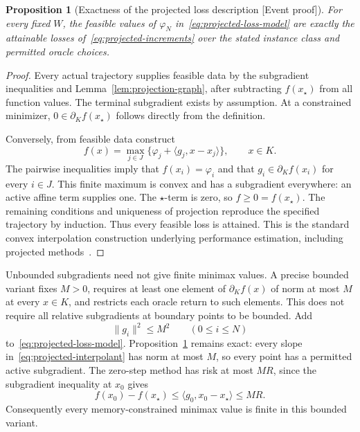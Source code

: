 \documentclass[11pt]{article}
\newcommand{\supportlabel}[1]{\textcolor{blue!60!black}{\small\textsf{[#1]}}}
\newcommand{\eventproof}{\supportlabel{Event proof}}
\numberwithin{equation}{section}
\newtheorem{proposition}[theorem]{Proposition}
\theoremstyle{definition}
\begin{document}
\begin{proposition}[Exactness of the projected loss description \eventproof]\label{prop:projected-loss}
For every fixed $W$, the feasible values of $\varphi_N$ in~\eqref{eq:projected-loss-model} are exactly the attainable losses of~\eqref{eq:projected-increments} over the stated instance class and permitted oracle choices.
\end{proposition}
\begin{proof}
Every actual trajectory supplies feasible data by the subgradient inequalities and Lemma~\ref{lem:projection-graph}, after subtracting $f(x_\star)$ from all function values. The terminal subgradient exists by assumption. At a constrained minimizer, $0\in\partial_K f(x_\star)$ follows directly from the definition.

Conversely, from feasible data construct
\begin{equation}
 f(x)=\max_{j\in J}
       \{\varphi_j+\langle g_j,x-x_j\rangle\},\qquad x\in K.
 \label{eq:projected-interpolant}
\end{equation}
The pairwise inequalities imply that $f(x_i)=\varphi_i$ and that $g_i\in\partial_K f(x_i)$ for every $i\in J$. This finite maximum is convex and has a subgradient everywhere: an active affine term supplies one. The $\star$-term is zero, so $f\ge0=f(x_\star)$. The remaining conditions and uniqueness of projection reproduce the specified trajectory by induction. Thus every feasible loss is attained. This is the standard convex interpolation construction underlying performance estimation, including projected methods~\cite{THGcomp}.
\end{proof}

Unbounded subgradients need not give finite minimax values. A precise bounded variant fixes $M>0$, requires at least one element of $\partial_K f(x)$ of norm at most $M$ at every $x\in K$, and restricts each oracle return to such elements. This does not require all relative subgradients at boundary points to be bounded. Add
\begin{equation}
 \|g_i\|^2\le M^2\qquad(0\le i\le N)
 \label{eq:bounded-projected-subgradients}
\end{equation}
to~\eqref{eq:projected-loss-model}. Proposition~\ref{prop:projected-loss} remains exact: every slope in~\eqref{eq:projected-interpolant} has norm at most $M$, so every point has a permitted active subgradient. The zero-step method has risk at most $MR$, since the subgradient inequality at $x_0$ gives
\[
 f(x_0)-f(x_\star)
 \le\langle g_0,x_0-x_\star\rangle\le MR.
\]
Consequently every memory-constrained minimax value is finite in this bounded variant.
\end{document}
